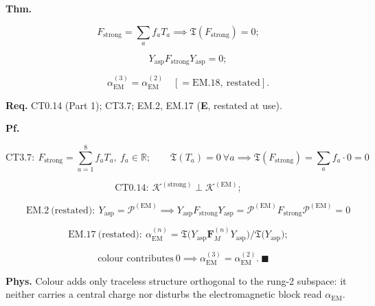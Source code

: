 \begin{theorem}\label{tag:CT3-10}
\textbf{Thm.}

\[
F_{\mathrm{strong}}=\textstyle\sum_af_aT_a\implies\mathfrak T(F_{\mathrm{strong}})=0;
\]

\[
\qquad Y_{\mathrm{asp}}F_{\mathrm{strong}}Y_{\mathrm{asp}}=0;
\]

\[
\qquad \alpha_{\mathrm{EM}}^{(3)}=\alpha_{\mathrm{EM}}^{(2)}\quad[=\mathrm{EM.18},\ \text{restated}].
\]

\textbf{Req.} CT0.14 (Part 1); CT3.7; EM.2, EM.17 (\textbf{E}, restated at use).

\textbf{Pf.}

\[
\mathrm{CT3.7}:\ F_{\mathrm{strong}}=\textstyle\sum_{a=1}^{8}f_aT_a,\ f_a\in\mathbb R;\qquad
\mathfrak T(T_a)=0\ \forall a\implies\mathfrak T(F_{\mathrm{strong}})=\textstyle\sum_af_a\cdot0=0
\]

\[
\mathrm{CT0.14}:\ \mathcal K^{(\mathrm{strong})}\perp\mathcal K^{(\mathrm{EM})};
\]

\[
\qquad \mathrm{EM.2}\ \text{(restated)}:\ Y_{\mathrm{asp}}=\mathcal P^{(\mathrm{EM})}\implies Y_{\mathrm{asp}}F_{\mathrm{strong}}Y_{\mathrm{asp}}=\mathcal P^{(\mathrm{EM})}F_{\mathrm{strong}}\mathcal P^{(\mathrm{EM})}=0
\]

\[
\mathrm{EM.17}\ \text{(restated)}:\ \alpha_{\mathrm{EM}}^{(n)}=\mathfrak T\bigl(Y_{\mathrm{asp}}\mathbf F_M^{(n)}Y_{\mathrm{asp}}\bigr)/\mathfrak T\bigl(Y_{\mathrm{asp}}\bigr);
\]

\[
\quad \text{colour contributes}\ 0\implies\alpha_{\mathrm{EM}}^{(3)}=\alpha_{\mathrm{EM}}^{(2)}.\ \blacksquare
\]

\textbf{Phys.} Colour adds only traceless structure orthogonal to the rung-2 subspace: it neither carries a central charge nor disturbs the electromagnetic block read $\alpha_{\mathrm{EM}}$.

\end{theorem}

